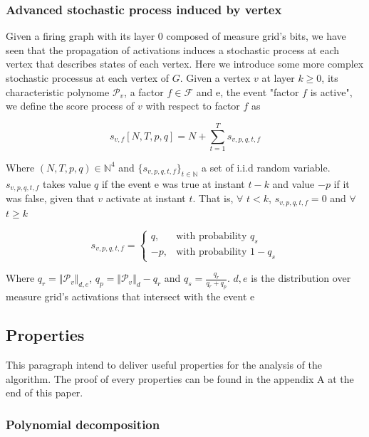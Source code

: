 \documentclass[a4paper, 11pt]{article}
\begin{document}
\subsubsection*{Advanced stochastic process induced by vertex}

Given a firing graph with its layer 0 composed of measure grid's bits, we have seen that the propagation of activations induces a stochastic process at each vertex that describes states of each vertex. Here we introduce some more complex stochastic processus at each vertex of $G$. Given a vertex $v$ at layer $k \geq 0$, its  characteristic polynome $\mathcal{P}_{v}$, a factor $f \in \mathcal{F}$ and e, the event "factor $f$ is active", we define the score process of $v$ with respect to factor $f$ as

\begin{equation*}
s_{v,f}\left[N, T, p, q \right] = N + \sum_{t=1}^{T} s_{v, p, q, t, f}
\end{equation*}

Where $(N, T, p, q) \in \mathbb{N}^4$ and $\lbrace s_{v, p, q, t, f} \rbrace_{t \in \mathbb{N}}$ a set of i.i.d random variable. $s_{v, p, q, t, f}$ takes value $q$ if the event e was true at instant $t - k $ and value $-p$ if it was false, given that $v$ activate at instant $t$. That is, $\forall$ $t  < k $, $s_{v, p, q,t, f} = 0$ and $\forall$ $t  \geq k$

\begin{equation*}
s_{v, p,q, t, f} = \begin{cases} q, & \text{with probability } q_s  \\ -p, & \text{with probability } 1 - q_s \end{cases}
\end{equation*}

Where $q_r = \Vert \mathcal{P}_v \Vert_{d,e} $, $q_p = \Vert \mathcal{P}_v \Vert_{d} - q_r$ and $q_s = \frac{q_r}{q_r + q_p}$.  $d, e$ is the distribution over measure grid's activations that intersect with the event e

\subsection{Properties}

This paragraph intend to deliver useful properties for the analysis of the algorithm. The proof of every properties can be found in the appendix A at the end of this paper.

\subsubsection*{Polynomial decomposition}
\end{document}
